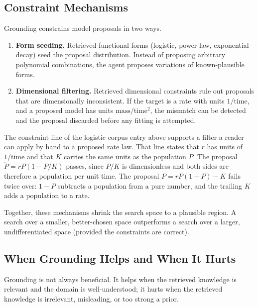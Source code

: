 \subsection{Constraint Mechanisms}

Grounding constrains model proposals in two ways.

\begin{enumerate}
\item \textbf{Form seeding.} Retrieved functional forms (logistic, power-law, exponential decay) seed the proposal distribution.
Instead of proposing arbitrary polynomial combinations, the agent proposes variations of known-plausible forms.

\item \textbf{Dimensional filtering.} Retrieved dimensional constraints rule out proposals that are dimensionally inconsistent.
If the target is a rate with units $1/\text{time}$, and a proposed model has units $\text{mass}/\text{time}^2$, the mismatch can be detected and the proposal discarded before any fitting is attempted.
\end{enumerate}

\begin{example}
The constraint line of the logistic corpus entry above supports a filter a reader can apply by hand to a proposed rate law.
That line states that $r$ has units of $1/\text{time}$ and that $K$ carries the same units as the population $P$.
The proposal $\dot{P} = r P (1 - P/K)$ passes, since $P/K$ is dimensionless and both sides are therefore a population per unit time.
The proposal $\dot{P} = r P (1 - P) - K$ fails twice over: $1 - P$ subtracts a population from a pure number, and the trailing $K$ adds a population to a rate.
\end{example}

Together, these mechanisms shrink the search space to a plausible region.
A search over a smaller, better-chosen space outperforms a search over a larger, undifferentiated space (provided the constraints are correct).

\subsection{When Grounding Helps and When It Hurts}

Grounding is not always beneficial.
It helps when the retrieved knowledge is relevant and the domain is well-understood; it hurts when the retrieved knowledge is irrelevant, misleading, or too strong a prior.

